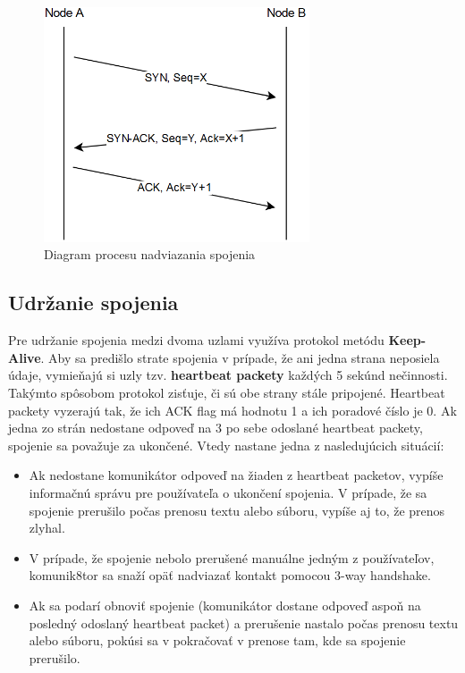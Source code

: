 \documentclass[a4paper,12pt]{article}
\begin{document}
	\begin{figure}[h]
		\centering
		\includegraphics[width=0.70\textwidth]{handshake_diagram.png}
		\caption{Diagram procesu nadviazania spojenia}
		\label{fig:handshake_diagram}
	\end{figure}
	

    \subsection{Udržanie spojenia}\label{keepalive}
	Pre udržanie spojenia medzi dvoma uzlami využíva protokol metódu \textbf{Keep-Alive}. Aby sa predišlo strate spojenia v prípade, že ani jedna strana neposiela údaje, vymieňajú si uzly tzv. \textbf{heartbeat packety} každých 5 sekúnd nečinnosti. Takýmto spôsobom protokol zisťuje, či sú obe strany stále pripojené. Heartbeat packety vyzerajú tak, že ich ACK flag má hodnotu 1 a ich poradové číslo je 0. Ak jedna zo strán nedostane odpoveď na 3 po sebe odoslané heartbeat packety, spojenie sa považuje za ukončené. Vtedy nastane jedna z nasledujúcich situácií:

	\begin{itemize}
	\item Ak nedostane komunikátor odpoveď na žiaden z heartbeat packetov, vypíše informačnú správu pre používateľa o ukončení spojenia. V prípade, že sa spojenie prerušilo počas prenosu textu alebo súboru, vypíše aj to, že prenos zlyhal.
	\item V prípade, že spojenie nebolo prerušené manuálne jedným z používateľov, komunik8tor sa snaží opäť nadviazať kontakt pomocou 3-way handshake.
	\item Ak sa podarí obnoviť spojenie (komunikátor dostane odpoveď aspoň na posledný odoslaný heartbeat packet) a prerušenie nastalo počas prenosu textu alebo súboru, pokúsi sa v pokračovať v prenose tam, kde sa spojenie prerušilo.
   	\end{itemize}
\end{document}
